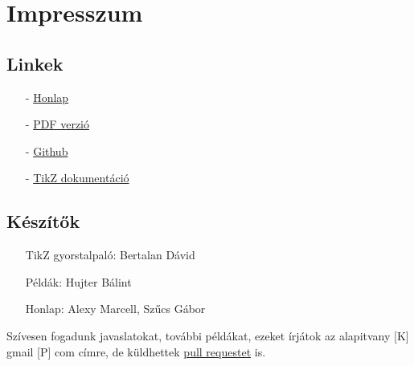 \chapter{Impresszum}

\section{Linkek}
\begin{enumerate}
    \item[-] \href{./index.html}{Honlap}
    \item[-] \href{./mainpage.pdf}{PDF verzió}
    \item[-] \href{https://github.com/a-gondolkodas-orome/tikz-tutorial}{Github} 
    \item[-] \href{https://ctan.ijs.si/tex-archive/graphics/pgf/base/doc/pgfmanual.pdf}{TikZ dokumentáció} 
\end{enumerate}
        
\section{Készítők}
\begin{enumerate}
    \item[] TikZ gyorstalpaló: Bertalan Dávid
    \item[] Példák: Hujter Bálint
    \item[] Honlap: Alexy Marcell, Szűcs Gábor
\end{enumerate}

Szívesen fogadunk javaslatokat, további példákat, ezeket írjátok az alapitvany [K] gmail [P] com címre, de küldhettek \href{https://github.com/a-gondolkodas-orome/tikz-tutorial/pulls}{pull requestet} is. 
